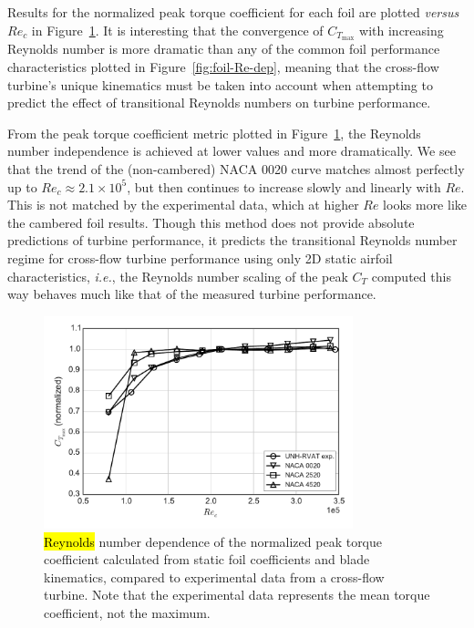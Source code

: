 \documentclass[energies,article,accept,moreauthors,pdftex,10pt,a4paper]{mdpi}
\theoremstyle{mdpi}
\newcounter{ex}
\newcounter{re}
\begin{document}
Results for the normalized peak torque coefficient for each foil are plotted
\textit{versus} $Re_c$ in Figure~\ref{fig:foils-C_T-Re-dep}. It is interesting that the
convergence of $C_{T_\mathrm{max}}$ with increasing Reynolds number is more
dramatic than any of the common foil performance characteristics plotted in
Figure~\ref{fig:foil-Re-dep}, meaning that the cross-flow turbine's unique
kinematics must be taken into account when attempting to predict the effect of
transitional Reynolds numbers on turbine performance.

From the peak torque coefficient metric plotted in
Figure~\ref{fig:foils-C_T-Re-dep}, the Reynolds number independence is achieved
at lower values and more dramatically. We see that the trend of the
(non-cambered) NACA 0020 curve matches almost perfectly up to $Re_c \approx 2.1
\times 10^5$, but then continues to increase slowly and linearly with $Re$. This
is not matched by the experimental data, which at higher $Re$ looks more like
the cambered foil results. Though this method does not provide absolute
predictions of turbine performance, it predicts the transitional Reynolds number
regime for cross-flow turbine performance using only 2D static airfoil
characteristics, \emph{i.e.}, the Reynolds number scaling of the peak $C_T$ computed this
way behaves much like that of the measured turbine performance.

\begin{figure}[H]
\centering

\includegraphics[width=0.8\textwidth]{figures/cft_re_dep_foils}

\caption{\hl {Reynolds} number dependence of the normalized peak torque coefficient
 calculated from static foil coefficients and blade kinematics, compared to
 experimental data from a cross-flow turbine. Note that the experimental data
 represents the mean torque coefficient, not the maximum.}

\label{fig:foils-C_T-Re-dep}
\end{figure}
\end{document}

